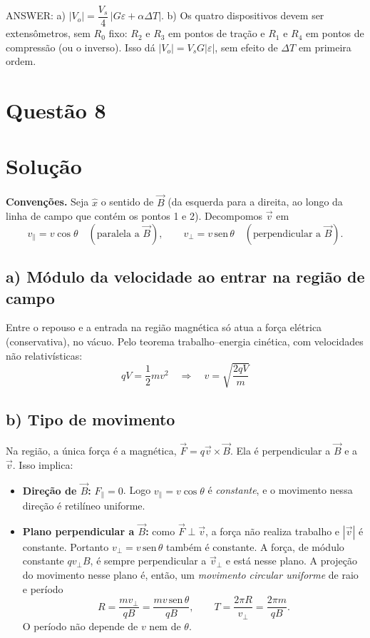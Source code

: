 \documentclass{article}%
\begin{document}
ANSWER: a) $|V_o|=\dfrac{V_s}{4}\,|G\varepsilon+\alpha\Delta T|$. b) Os quatro dispositivos devem ser extensômetros, sem $R_0$ fixo: $R_2$ e $R_3$ em pontos de tração e $R_1$ e $R_4$ em pontos de compressão (ou o inverso). Isso dá $|V_o|=V_sG|\varepsilon|$, sem efeito de $\Delta T$ em primeira ordem.%
\newpage%
\section*{Questão 8}

\section*{Solução}

\textbf{Convenções.} Seja $\hat{x}$ o sentido de $\vec B$ (da esquerda para a direita, ao longo da linha de campo que contém os pontos 1 e 2). Decompomos $\vec v$ em
\[
v_\parallel = v\cos\theta \quad (\text{paralela a } \vec B), \qquad v_\perp = v\,\mathrm{sen}\,\theta \quad (\text{perpendicular a } \vec B).
\]

\subsection*{a) Módulo da velocidade ao entrar na região de campo}

Entre o repouso e a entrada na região magnética só atua a força elétrica (conservativa), no vácuo. Pelo teorema trabalho--energia cinética, com velocidades não relativísticas:
\[
qV=\frac{1}{2}mv^{2}
\quad\Longrightarrow\quad
\boxed{v=\sqrt{\frac{2qV}{m}}}
\]

\subsection*{b) Tipo de movimento}

Na região, a única força é a magnética, $\vec F=q\vec v\times\vec B$. Ela é perpendicular a $\vec B$ e a $\vec v$. Isso implica:

\begin{itemize}
\item \textbf{Direção de $\vec B$:} $F_\parallel=0$. Logo $v_\parallel=v\cos\theta$ é \emph{constante}, e o movimento nessa direção é retilíneo uniforme.
\item \textbf{Plano perpendicular a $\vec B$:} como $\vec F\perp\vec v$, a força não realiza trabalho e $|\vec v|$ é constante. Portanto $v_\perp=v\,\mathrm{sen}\,\theta$ também é constante. A força, de módulo constante $qv_\perp B$, é sempre perpendicular a $\vec v_\perp$ e está nesse plano. A projeção do movimento nesse plano é, então, um \emph{movimento circular uniforme} de raio e período
\[
R=\frac{mv_\perp}{qB}=\frac{mv\,\mathrm{sen}\,\theta}{qB},
\qquad
T=\frac{2\pi R}{v_\perp}=\frac{2\pi m}{qB}.
\]
O período não depende de $v$ nem de $\theta$.
\end{itemize}
\end{document}
